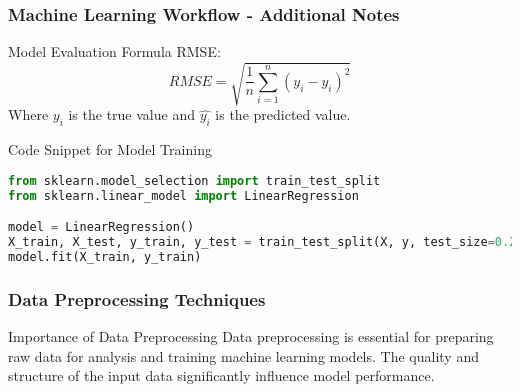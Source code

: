 \documentclass[aspectratio=169]{beamer}
\begin{document}
\begin{frame}[fragile]
    \frametitle{Machine Learning Workflow - Additional Notes}
    \begin{block}{Model Evaluation Formula}
        RMSE: 
        \begin{equation}
            RMSE = \sqrt{\frac{1}{n}\sum_{i=1}^{n}(y_i - \hat{y_i})^2}
        \end{equation}
        Where \(y_i\) is the true value and \(\hat{y_i}\) is the predicted value.
    \end{block}

    \begin{block}{Code Snippet for Model Training}
        \begin{lstlisting}[language=Python]
from sklearn.model_selection import train_test_split
from sklearn.linear_model import LinearRegression

model = LinearRegression()
X_train, X_test, y_train, y_test = train_test_split(X, y, test_size=0.2)
model.fit(X_train, y_train)
        \end{lstlisting}
    \end{block}
\end{frame}

\begin{frame}
    \frametitle{Data Preprocessing Techniques}
    \begin{block}{Importance of Data Preprocessing}
        Data preprocessing is essential for preparing raw data for analysis and training machine learning models. The quality and structure of the input data significantly influence model performance.
    \end{block}
\end{frame}
\end{document}
